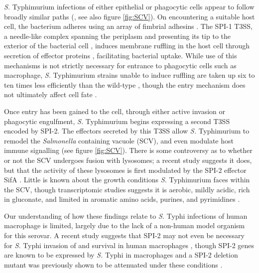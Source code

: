 \textit{S.} Typhimurium infections of either epithelial or phagocytic cells appear to follow broadly similar paths (\textcite{Figueira2012}, see also figure \ref{fig:SCV}). On encountering a suitable host cell, the bacterium adheres using an array of fimbrial adhesins \parencite{Baumler1996a, Velden1998}. The SPI-1 T3SS, a needle-like complex spanning the periplasm and presenting its tip to the exterior of the bacterial cell \parencite{Mueller2008}, induces membrane ruffling in the host cell through secretion of effector proteins \parencite{Zhou2001}, facilitating bacterial uptake. While use of this mechanisms is not strictly necessary for entrance to phagocytic cells such as macrophage, {\it S.} Typhimurium strains unable to induce ruffling are taken up six to ten times less efficiently than the wild-type \parencite{Monack1996}, though the entry mechanism does not ultimately affect cell fate \parencite{Rathman1997}.

Once entry has been gained to the cell, through either active invasion or phagocytic engulfment, {\it S.} Typhimurium begins expressing a second T3SS encoded by SPI-2. The effectors secreted by this T3SS allow {\it S.} Typhimurium to remodel the \textit{Salmonella} containing vacuole (SCV), and even modulate host immune signalling (see figure \ref{fig:SCV}). There is some controversy as to whether or not the SCV undergoes fusion with lysosomes; a recent study suggests it does, but that the activity of these lysosomes is first modulated by the SPI-2 effector SifA \parencite{McGourty2012}. Little is known about the growth conditions {\it S.} Typhimurium faces within the SCV, though transcriptomic studies suggests it is aerobic, mildly acidic, rich in gluconate, and limited in aromatic amino acids, purines, and pyrimidines \parencite{Eriksson2003, Hautefort2008}.

Our understanding of how these findings relate to {\it S.} Typhi infections of human macrophage is limited, largely due to the lack of a non-human model organism for this serovar. A recent study suggests that SPI-2 may not even be necessary for {\it S.} Typhi invasion of and survival in human macrophages \parencite{Forest2010}, though SPI-2 genes are known to be expressed by {\it S.} Typhi in macrophages \parencite{Faucher2006} and a SPI-2 deletion mutant was previously shown to be attenuated under these conditions \parencite{Khan2003}.


